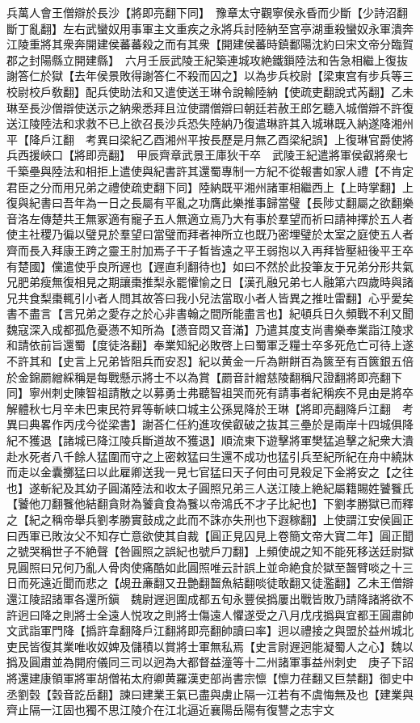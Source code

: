 兵萬人會王僧辯於長沙【將即亮翻下同】　豫章太守觀寧侯永昏而少斷【少詩沼翻斷丁亂翻】左右武蠻奴用事軍主文重疾之永將兵討陸納至宫亭湖重殺蠻奴永軍潰奔江陵重將其衆奔開建侯蕃蕃殺之而有其衆【開建侯蕃時鎮鄱陽沈約曰宋文帝分臨賀郡之封陽縣立開建縣】　六月壬辰武陵王紀築連城攻絶鐵鎻陸法和告急相繼上復抜謝答仁於獄【去年侯景敗得謝答仁不殺而囚之】以為步兵校尉【梁東宫有步兵等三校尉校戶敎翻】配兵使助法和又遣使送王琳令說輸陸納【使疏吏翻說式芮翻】乙未琳至長沙僧辯使送示之納衆悉拜且泣使謂僧辯曰朝廷若赦王郎乞聽入城僧辯不許復送江陵陸法和求救不已上欲召長沙兵恐失陸納乃復遣琳許其入城琳既入納遂降湘州平【降戶江翻　考異曰梁紀乙酉湘州平按長歷是月無乙酉梁紀誤】上復琳官爵使將兵西援峽口【將即亮翻】　甲辰齊章武景王庫狄干卒　武陵王紀遣將軍侯叡將衆七千築壘與陸法和相拒上遣使與紀書許其還蜀專制一方紀不從報書如家人禮【不肯定君臣之分而用兄弟之禮使疏吏翻下同】陸納既平湘州諸軍相繼西上【上時掌翻】上復與紀書曰吾年為一日之長屬有平亂之功膺此樂推事歸當璧【長陟丈翻屬之欲翻樂音洛左傳楚共王無冢適有寵子五人無適立焉乃大有事於羣望而祈曰請神擇於五人者使主社稷乃徧以璧見於羣望曰當璧而拜者神所立也既乃密埋璧於太室之庭使五人者齊而長入拜康王跨之靈王肘加焉子干子晳皆遠之平王弱抱以入再拜皆壓紐後平王卒有楚國】儻遣使乎良所遟也【遟直利翻待也】如曰不然於此投筆友于兄弟分形共氣兄肥弟瘦無復相見之期讓棗推梨永罷懽愉之日【漢孔融兄弟七人融第六四歲時與諸兄共食梨棗輒引小者人問其故答曰我小兒法當取小者人皆異之推吐雷翻】心乎愛矣書不盡言【言兄弟之愛存之於心非書翰之間所能盡言也】紀頓兵日久頻戰不利又聞魏寇深入成都孤危憂懣不知所為【懣音悶又音滿】乃遣其度支尚書樂奉業詣江陵求和請依前旨還蜀【度徒洛翻】奉業知紀必敗啓上曰蜀軍乏糧士卒多死危亡可待上遂不許其和【史言上兄弟皆阻兵而安忍】紀以黄金一斤為餅餅百為篋至有百篋銀五倍於金錦罽繒綵稱是每戰懸示將士不以為賞【罽音計繒慈陵翻稱尺證翻將即亮翻下同】寧州刺史陳智祖請散之以募勇士弗聽智祖哭而死有請事者紀稱疾不見由是將卒解體秋七月辛未巴東民符昇等斬峽口城主公孫晃降於王琳【將即亮翻降戶江翻　考異曰典畧作丙戌今從梁書】謝荅仁任約進攻侯叡破之抜其三壘於是兩岸十四城俱降紀不獲退【諸城已降江陵兵斷道故不獲退】順流東下遊擊將軍樊猛追擊之紀衆大潰赴水死者八千餘人猛圍而守之上密敕猛曰生還不成功也猛引兵至紀所紀在舟中繞牀而走以金囊擲猛曰以此雇卿送我一見七官猛曰天子何由可見殺足下金將安之【之往也】遂斬紀及其幼子圓滿陸法和收太子圓照兄弟三人送江陵上絶紀屬籍賜姓饕餮氏【饕他刀翻餮他結翻貪財為饕貪食為餮以帝鴻氏不才子比紀也】下劉孝勝獄已而釋之【紀之稱帝舉兵劉孝勝實鼓成之此而不誅亦失刑也下遐稼翻】上使謂江安侯圓正曰西軍已敗汝父不知存亡意欲使其自裁【圓正見囚見上卷簡文帝大寶二年】圓正聞之號哭稱世子不絶聲【咎圓照之誤紀也號戶刀翻】上頻使覘之知不能死移送廷尉獄見圓照曰兄何乃亂人骨肉使痛酷如此圓照唯云計誤上並命絶食於獄至齧臂啖之十三日而死遠近聞而悲之【覘丑亷翻又丑艶翻齧魚結翻啖徒敢翻又徒濫翻】乙未王僧辯還江陵詔諸軍各還所鎭　魏尉遟迥圍成都五旬永豐侯撝屢出戰皆敗乃請降諸將欲不許迥曰降之則將士全遠人悦攻之則將士傷遠人懼遂受之八月戊戌撝與宜都王圓肅帥文武詣軍門降【撝許韋翻降戶江翻將即亮翻帥讀曰率】迥以禮接之與盟於益州城北吏民皆復其業唯收奴婢及儲積以賞將士軍無私焉【史言尉遟迥能凝蜀人之心】魏以撝及圓肅並為開府儀同三司以迥為大都督益潼等十二州諸軍事益州刺史　庚子下詔將還建康領軍將軍胡僧祐太府卿黄羅漢吏部尚書宗懔【懔力荏翻又巨禁翻】御史中丞劉㲄【㲄音訖岳翻】諫曰建業王氣已盡與虜止隔一江若有不虞悔無及也【建業與齊止隔一江固也獨不思江陵介在江北逼近襄陽岳陽有復讐之志宇文